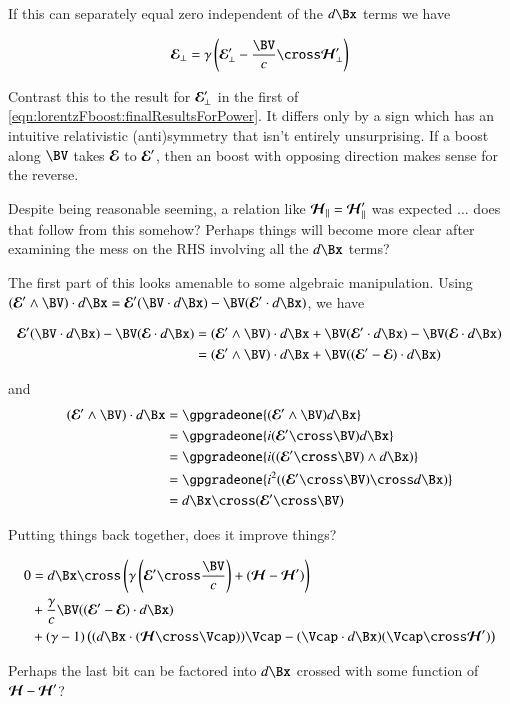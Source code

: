 If this can separately equal zero independent of the $d\Bx$ terms we have

\begin{align}
\EE_\perp = \gamma \left( \EE_\perp' - \frac{\BV}{c} \cross \HH_\perp' \right)
\end{align}

Contrast this to the result for $\boldsymbol{\mathcal{E}}_\perp'$ in the first of \ref{eqn:lorentzFboost:finalResultsForPower}.  It differs only by
a sign which has an intuitive relativistic (anti)symmetry that isn't entirely unsurprising.  If a boost along $\BV$
takes $\boldsymbol{\mathcal{E}}$ to $\boldsymbol{\mathcal{E}}'$, then an boost with opposing direction makes sense for the reverse.  

Despite being reasonable seeming, a relation like $\boldsymbol{\mathcal{H}}_\parallel = \boldsymbol{\mathcal{H}}_\parallel'$ was expected ... does that follow from this somehow?
Perhaps things will become more clear after examining the mess on the RHS involving all the $d\Bx$ terms?

The first part of this looks amenable to some algebraic manipulation.  Using
$(\EE' \wedge \BV) \cdot d\Bx = \EE' (\BV \cdot d\Bx) - \BV (\EE' \cdot d\Bx)$, we have

\begin{align*}
\EE' (\BV \cdot d\Bx ) - \BV ( \EE \cdot d\Bx )  
&=
(\EE' \wedge \BV) \cdot d\Bx + \BV (\EE' \cdot d\Bx) - \BV ( \EE \cdot d\Bx ) \\
&=
(\EE' \wedge \BV) \cdot d\Bx + \BV ((\EE' - \EE) \cdot d\Bx) \\
\end{align*}

and
\begin{align*}
(\EE' \wedge \BV) \cdot d\Bx 
&=
\gpgradeone{ (\EE' \wedge \BV) d\Bx } \\
&=
\gpgradeone{ i(\EE' \cross \BV) d\Bx } \\
&=
\gpgradeone{ i ((\EE' \cross \BV) \wedge d\Bx) } \\
&=
\gpgradeone{ i^2 ((\EE' \cross \BV) \cross d\Bx) } \\
&=
d\Bx \cross (\EE' \cross \BV) 
\end{align*}

Putting things back together, does it improve things?

\begin{align*}
0 &=
{d\Bx} \cross \left(
{\gamma} \left(\EE' \cross \frac{\BV}{c} \right) 
+ (\HH -\HH')
\right) \\
&+\frac{\gamma}{c} \BV ((\EE' - \EE) \cdot d\Bx)  \\
%
&+ (\gamma-1)
\left(
( d\Bx \cdot (\HH \cross \Vcap) ) \Vcap - (\Vcap \cdot d\Bx) (\Vcap \cross \HH') 
\right) \\
\end{align*}

Perhaps the last bit can be factored into $d\Bx$ crossed with some function of $\boldsymbol{\mathcal{H}} - \boldsymbol{\mathcal{H}}'$?
